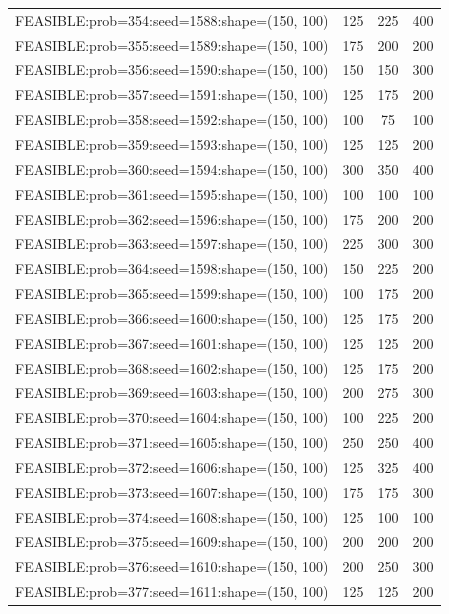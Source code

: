 \begin{longtable}{lccc}
FEASIBLE:prob=354:seed=1588:shape=(150, 100) &  125 &   225 &    400 \\
FEASIBLE:prob=355:seed=1589:shape=(150, 100) &  175 &   200 &    200 \\
FEASIBLE:prob=356:seed=1590:shape=(150, 100) &  150 &   150 &    300 \\
FEASIBLE:prob=357:seed=1591:shape=(150, 100) &  125 &   175 &    200 \\
FEASIBLE:prob=358:seed=1592:shape=(150, 100) &  100 &    75 &    100 \\
FEASIBLE:prob=359:seed=1593:shape=(150, 100) &  125 &   125 &    200 \\
FEASIBLE:prob=360:seed=1594:shape=(150, 100) &  300 &   350 &    400 \\
FEASIBLE:prob=361:seed=1595:shape=(150, 100) &  100 &   100 &    100 \\
FEASIBLE:prob=362:seed=1596:shape=(150, 100) &  175 &   200 &    200 \\
FEASIBLE:prob=363:seed=1597:shape=(150, 100) &  225 &   300 &    300 \\
FEASIBLE:prob=364:seed=1598:shape=(150, 100) &  150 &   225 &    200 \\
FEASIBLE:prob=365:seed=1599:shape=(150, 100) &  100 &   175 &    200 \\
FEASIBLE:prob=366:seed=1600:shape=(150, 100) &  125 &   175 &    200 \\
FEASIBLE:prob=367:seed=1601:shape=(150, 100) &  125 &   125 &    200 \\
FEASIBLE:prob=368:seed=1602:shape=(150, 100) &  125 &   175 &    200 \\
FEASIBLE:prob=369:seed=1603:shape=(150, 100) &  200 &   275 &    300 \\
FEASIBLE:prob=370:seed=1604:shape=(150, 100) &  100 &   225 &    200 \\
FEASIBLE:prob=371:seed=1605:shape=(150, 100) &  250 &   250 &    400 \\
FEASIBLE:prob=372:seed=1606:shape=(150, 100) &  125 &   325 &    400 \\
FEASIBLE:prob=373:seed=1607:shape=(150, 100) &  175 &   175 &    300 \\
FEASIBLE:prob=374:seed=1608:shape=(150, 100) &  125 &   100 &    100 \\
FEASIBLE:prob=375:seed=1609:shape=(150, 100) &  200 &   200 &    200 \\
FEASIBLE:prob=376:seed=1610:shape=(150, 100) &  200 &   250 &    300 \\
FEASIBLE:prob=377:seed=1611:shape=(150, 100) &  125 &   125 &    200 \\

\end{longtable}
